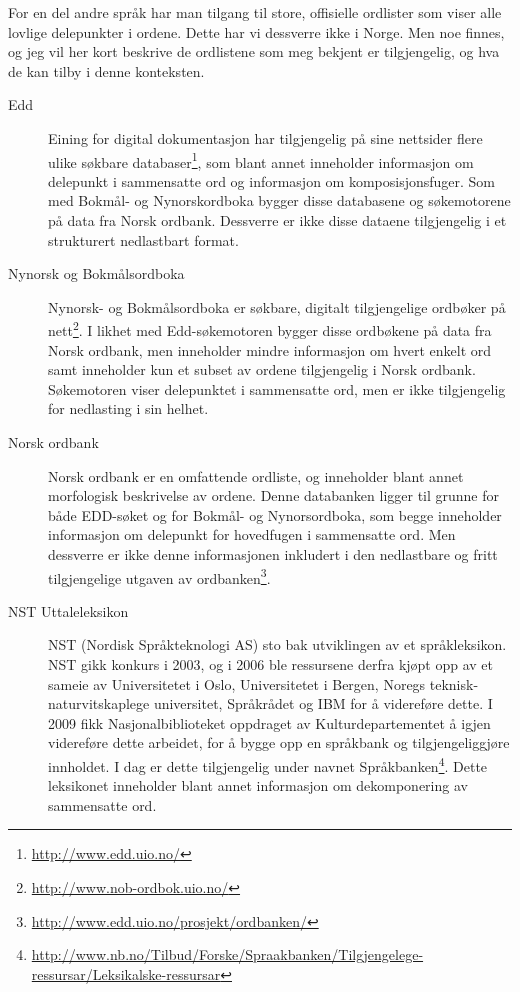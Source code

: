 For en del andre språk har man tilgang til store, offisielle ordlister som viser alle lovlige delepunkter i ordene. Dette har vi dessverre ikke i Norge. Men noe finnes, og jeg vil her kort beskrive de ordlistene som meg bekjent er tilgjengelig, og hva de kan tilby i denne konteksten. 

\begin{description}
\item [Edd]	Eining for digital dokumentasjon har tilgjengelig på sine nettsider flere ulike søkbare databaser\footnote{\url{http://www.edd.uio.no/}}, som blant annet inneholder informasjon om delepunkt i sammensatte ord og informasjon om komposisjonsfuger. Som med Bokmål- og Nynorskordboka bygger disse databasene og søkemotorene på data fra Norsk ordbank. Dessverre er ikke disse dataene tilgjengelig i et strukturert nedlastbart format. 
\item[Nynorsk og Bokmålsordboka] 	Nynorsk- og Bokmålsordboka er søkbare, digitalt tilgjengelige ordbøker på nett\footnote{\url{http://www.nob-ordbok.uio.no/}}. I likhet med Edd-søkemotoren bygger disse ordbøkene på data fra Norsk ordbank, men inneholder mindre informasjon om hvert enkelt ord samt inneholder kun et subset av ordene tilgjengelig i Norsk ordbank. Søkemotoren viser delepunktet i sammensatte ord, men er ikke tilgjengelig for nedlasting i sin helhet.
\item[Norsk ordbank] Norsk ordbank er en omfattende ordliste, og inneholder blant annet morfologisk beskrivelse av ordene. Denne databanken ligger til grunne for både EDD-søket og for Bokmål- og Nynorsordboka, som begge inneholder informasjon om delepunkt for hovedfugen i sammensatte ord. Men dessverre er ikke denne informasjonen inkludert i den nedlastbare og fritt tilgjengelige utgaven av ordbanken\footnote{\url{http://www.edd.uio.no/prosjekt/ordbanken/}}.
\item[NST Uttaleleksikon]	NST (Nordisk Språkteknologi AS) sto bak utviklingen av et språkleksikon. NST gikk konkurs i 2003, og i 2006 ble ressursene derfra kjøpt opp av et sameie av Universitetet i Oslo, Universitetet i Bergen, Noregs teknisk-naturvitskaplege universitet, Språkrådet og IBM for å videreføre dette. I 2009 fikk Nasjonalbiblioteket oppdraget av Kulturdepartementet å igjen videreføre dette arbeidet, for å bygge opp en språkbank og tilgjengeliggjøre innholdet. I dag er dette tilgjengelig under navnet Språkbanken\footnote{\url{http://www.nb.no/Tilbud/Forske/Spraakbanken/Tilgjengelege-ressursar/Leksikalske-ressursar}}. Dette leksikonet inneholder blant annet informasjon om dekomponering av sammensatte ord.

\end{description}
